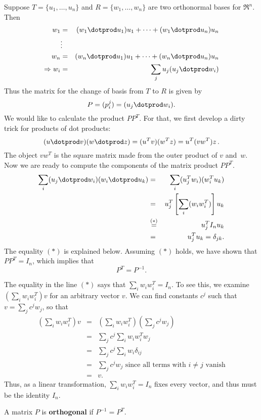 Suppose $T=\{u_1, \ldots, u_n \}$ and $R=\{w_1, \ldots, w_n \}$ are two orthonormal bases for $\Re^n$.  Then\\[3mm]
\begin{eqnarray*}
w_1 &=& (w_1\dotprod u_1) u_1 + \cdots + (w_1\dotprod u_n)u_n\\
 & \vdots & \\
w_n &=& (w_n\dotprod u_1) u_1 + \cdots + (w_n\dotprod u_n)u_n\\
\Rightarrow w_i &=& \sum_j u_j(u_j\dotprod w_i) \\
\end{eqnarray*}
Thus the matrix for the change of basis from $T$ to $R$ is given by 
\[
P = (p^j_i) = (u_j\dotprod w_i).
\]
We would like to calculate the product $PP^T$. For that, we first develop a dirty trick for products of dot products:
\[
(u\dotprod v)(w\dotprod z)=(u^T v) (w^T z) = u^T (v w^T) z\, . 
\]
The object $v w^T$ is the square matrix made from the outer product of $v$ and~$w$. 
Now we are ready to compute the components of the matrix product $PP^T$.
\begin{eqnarray*}
\sum_i(u_j\dotprod w_i)(w_i\dotprod u_k)&=&
 \sum_i(u_j^T w_i) (w_i^T u_k)\\
&=& u_j^T \left[\sum_i (w_i w_i^T) \right] u_k \\
&\stackrel{(*)}=& u_j^T I_n u_k \\\
&=& u_j^T u_k = \delta_{jk}.
\end{eqnarray*}
The equality $(*)$ is explained below.  Assuming $(*)$ holds, we have shown that $PP^T=I_n$, which implies that 
\[
P^T=P^{-1}.
\]

The equality in the line $(*)$ says that $\sum_i w_i w_i^T=I_n$.  To see this, we examine $\left(\sum_i w_i w_i^T\right)v$ for an arbitrary vector $v$.  We can find constants $c^j$ such that $v=\sum_j c^jw_j$, so that
\begin{eqnarray*}
\left(\sum_i w_i w_i^T\right)v &=& \left(\sum_i w_i w_i^T\right)\left(\sum_j c^jw_j\right) \\
&=& \sum_j c^j \sum_i w_i w_i^T w_j \\
&=& \sum_j c^j \sum_i w_i \delta_{ij} \\
&=& \sum_j c^j w_j \text{ since all terms with $i\neq j$ vanish}\\
&=&v.
\end{eqnarray*}
Thus, as a linear transformation, $\sum_i w_i w_i^T=I_n$ fixes every vector, and thus must be the identity $I_n$.

\begin{definition}
A matrix $P$ is {\bfseries orthogonal} if $P^{-1}=P^T$.
\end{definition}

